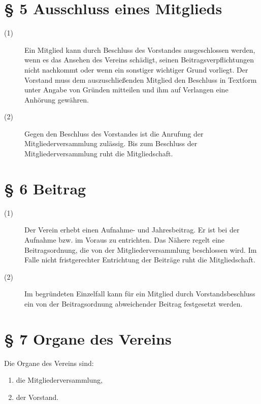 \documentclass[12pt,paper=a4,ngerman]{scrreprt}
\begin{document}
\section{\S{} 5 Ausschluss eines Mitglieds}
\begin{description}
	\item[(1)] Ein Mitglied kann durch Beschluss des Vorstandes ausgeschlossen werden, wenn es das Ansehen des Vereins schädigt, seinen Beitragsverpflichtungen nicht nachkommt oder wenn ein sonstiger wichtiger Grund vorliegt. Der Vorstand muss dem auszuschließenden Mitglied den Beschluss in Textform unter Angabe von Gründen mitteilen und ihm auf Verlangen eine Anhörung gewähren.
	\item[(2)] Gegen den Beschluss des Vorstandes ist die Anrufung der Mitgliederversammlung zulässig. Bis zum Beschluss der Mitgliederversammlung ruht die Mitgliedschaft.
\end{description}
\section{\S{} 6 Beitrag}
\begin{description}
	\item[(1)] Der Verein erhebt einen Aufnahme- und Jahresbeitrag. Er ist bei der Aufnahme bzw. im Voraus zu entrichten. Das Nähere regelt eine Beitragsordnung, die von der Mitgliederversammlung beschlossen wird. Im Falle nicht fristgerechter Entrichtung der Beiträge ruht die Mitgliedschaft.
	\item[(2)] Im begründeten Einzelfall kann für ein Mitglied durch Vorstandsbeschluss ein von der Beitragsordnung abweichender Beitrag festgesetzt werden.
\end{description}
\section{\S{} 7 Organe des Vereins}
Die Organe des Vereins sind:
\begin{enumerate}
	\item die Mitgliederversammlung,
	\item der Vorstand.
\end{enumerate}
\end{document}
